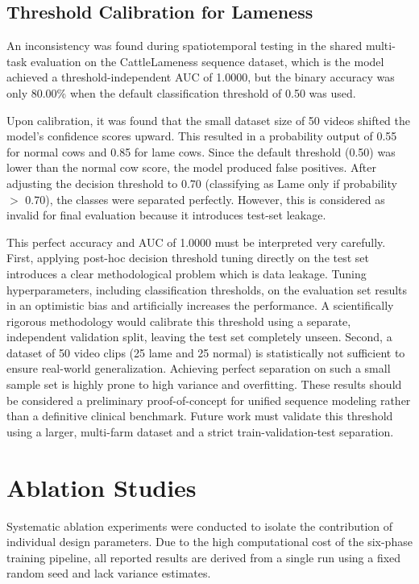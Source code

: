 \subsection{Threshold Calibration for Lameness}
An inconsistency was found during spatiotemporal testing in the shared multi-task evaluation on the CattleLameness sequence dataset, which is the model achieved a threshold-independent AUC of 1.0000, but the binary accuracy was only 80.00\% when the default classification threshold of 0.50 was used.

Upon calibration, it was found that the small dataset size of 50 videos shifted the model's confidence scores upward. This resulted in a probability output of 0.55 for normal cows and 0.85 for lame cows. Since the default threshold (0.50) was lower than the normal cow score, the model produced false positives. After adjusting the decision threshold to 0.70 (classifying as Lame only if probability $>$ 0.70), the classes were separated perfectly. However, this is considered as invalid for final evaluation because it introduces test-set leakage. 

This perfect accuracy and AUC of 1.0000 must be interpreted very carefully. First, applying post-hoc decision threshold tuning directly on the test set introduces a clear methodological problem which is data leakage. Tuning hyperparameters, including classification thresholds, on the evaluation set results in an optimistic bias and artificially increases the performance. A scientifically rigorous methodology would calibrate this threshold using a separate, independent validation split, leaving the test set completely unseen. Second, a dataset of 50 video clips (25 lame and 25 normal) is statistically not sufficient to ensure real-world generalization. Achieving perfect separation on such a small sample set is highly prone to high variance and overfitting. These results should be considered a preliminary proof-of-concept for unified sequence modeling rather than a definitive clinical benchmark. Future work must validate this threshold using a larger, multi-farm dataset and a strict train-validation-test separation.

\section{Ablation Studies}
Systematic ablation experiments were conducted to isolate the contribution of individual design parameters. Due to the high computational cost of the six-phase training pipeline, all reported results are derived from a single run using a fixed random seed and lack variance estimates.

